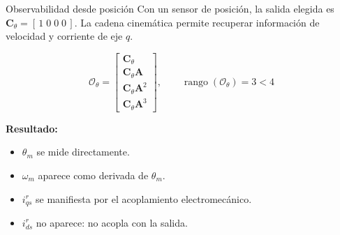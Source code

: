 \documentclass[aspectratio=169,t]{beamer}
\begin{document}
\begin{frame}{Observabilidad desde posición}
{\small\color{uncGray}Con un sensor de posición, la salida elegida es $\bm{C}_\theta=[\,1\;0\;0\;0\,]$. La cadena cinemática permite recuperar información de velocidad y corriente de eje $q$.}\par
\vspace{3mm}

\begin{equation*}
\mathcal{O}_\theta=
\begin{bmatrix}
\bm{C}_\theta\\
\bm{C}_\theta\bm{A}\\
\bm{C}_\theta\bm{A}^2\\
\bm{C}_\theta\bm{A}^3
\end{bmatrix},
\qquad
\operatorname{rango}(\mathcal{O}_\theta)=3<4
\end{equation*}

\textbf{Resultado:}
\begin{itemize}
  \item $\theta_m$ se mide directamente.
  \item $\omega_m$ aparece como derivada de $\theta_m$.
  \item $i_{qs}^r$ se manifiesta por el acoplamiento electromecánico.
  \item $i_{ds}^{r}$ no aparece: no acopla con la salida.
\end{itemize}
\end{frame}
\end{document}
